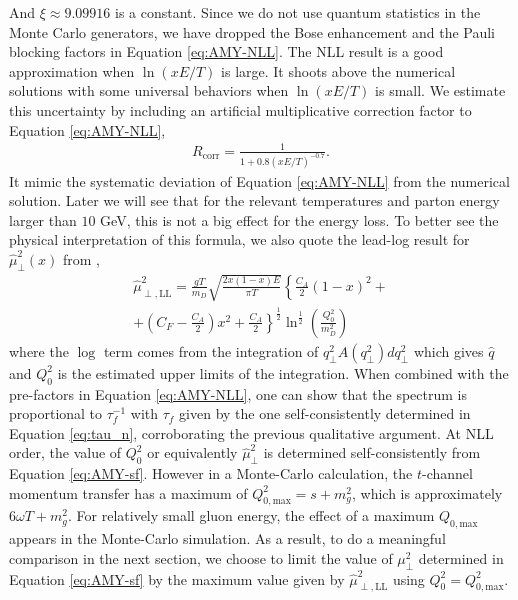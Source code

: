 \documentclass[aps, prc, reprint, amsmath, groupedaddress, nofootinbib]{revtex4-1}
\begin{document}
And $\xi\approx9.09916$ is a constant. Since we do not use quantum statistics in the Monte Carlo generators, we have dropped the Bose enhancement and the Pauli blocking factors in Equation \ref{eq:AMY-NLL}.
The NLL result is a good approximation when $\ln(xE/T)$ is large. 
It shoots above the numerical solutions with some universal behaviors when $\ln(xE/T)$ is small.
We estimate this uncertainty by including an artificial multiplicative correction factor to Equation \ref{eq:AMY-NLL}, 
\begin{eqnarray}\label{eq:correction}
R_{\textrm{corr}} = \frac{1}{1+0.8\left(xE/T\right)^{-0.7}}.
\end{eqnarray}
It mimic the systematic deviation of Equation \ref{eq:AMY-NLL} from the numerical solution. 
Later we will see that for the relevant temperatures and parton energy larger than $10$ GeV, this is not a big effect for the energy loss.
To better see the physical interpretation of this formula, we also quote the lead-log result for $\hat{\mu}_\perp^2(x)$ from \cite{Arnold:2008zu},
\begin{eqnarray}\label{eq:AMY-LL}
\nonumber
\hat{\mu}_{\perp, \textrm{LL}}^2 = \frac{gT}{m_D} \sqrt{\frac{2x(1-x)E}{\pi T}}\left\{
\frac{C_A}{2}(1-x)^2 + \right.\\
\left. + \left(C_F - \frac{C_A}{2}\right)x^2 + \frac{C_A}{2}\right\}^{\frac{1}{2}}\ln^{\frac{1}{2}}\left(\frac{Q_0^2}{m_D^2}\right)
\end{eqnarray}
where the $\log$ term comes from the integration of $q_\perp^2 A(q_\perp^2)dq_\perp^2$ which gives $\hat{q}$ and $Q_0^2$ is the estimated upper limits of the integration. 
When combined with the pre-factors in Equation \ref{eq:AMY-NLL}, one can show that the spectrum is proportional to $\tau_f^{-1}$ with $\tau_f$ given by the one self-consistently determined in Equation \ref{eq:tau_n}, corroborating the previous qualitative argument.
At NLL order, the value of $Q_0^2$ or equivalently $\hat{\mu}_\perp^2$ is determined self-consistently from Equation \ref{eq:AMY-sf}.
However in a Monte-Carlo calculation, the $t$-channel momentum transfer has a maximum of $Q_{0,\textrm{max}}^2 = s+m_g^2$, which is approximately $6\omega T+m_g^2$.
For relatively small gluon energy, the effect of a maximum $Q_{0,\textrm{max}}$  appears in the Monte-Carlo simulation. 
As a result, to do a meaningful comparison in the next section, we choose to limit the value of $\mu_\perp^2$ determined in Equation \ref{eq:AMY-sf} by the maximum value given by $\hat{\mu}_{\perp, \textrm{LL}}^2$ using $Q_0^2 = Q_{0,\textrm{max}}^2$.
\end{document}
